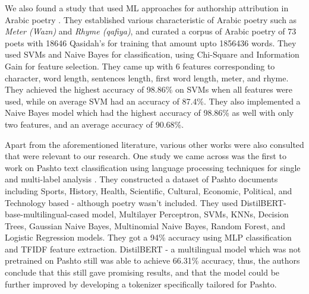 We also found a study that used ML approaches for authorship attribution in Arabic poetry \cite{arabic_poetry_attribution}. They established various characteristic of Arabic poetry such as \textit{Meter (Wazn)} and \textit{Rhyme (qafiya)}, and curated a corpus of Arabic poetry of 73 poets with 18646 Qasidah's for training that amount upto 1856436 words. They used SVMs and Naive Bayes for classification, using Chi-Square and Information Gain for feature selection. They came up with 6 features corresponding to character, word length, sentences length, first word length, meter, and rhyme. They achieved the highest accuracy of 98.86\% on SVMs when all features were used, while on average SVM had an accuracy of 87.4\%. They also implemented a Naive Bayes model which had the highest accuracy of 98.86\% as well with only two features, and an average accuracy of 90.68\%. 

Apart from the aforementioned literature, various other works were also consulted that were relevant to our research. One study we came across was the first to work on Pashto text classification using language processing techniques for single and multi-label analysis \cite{pashto_text_classification}. They constructed a dataset of Pashto documents including Sports, History, Health, Scientific, Cultural, Economic, Political, and Technology based - although poetry wasn't included. They used DistilBERT-base-multilingual-cased model, Multilayer Perceptron, SVMs, KNNs, Decision Trees, Gaussian Naive Bayes, Multinomial Naive Bayes, Random Forest, and Logistic Regression models. They got a 94\% accuracy using MLP classification and TFIDF feature extraction. DistilBERT - a multilingual model which was not pretrained on Pashto still was able to achieve 66.31\% accuracy, thus, the authors conclude that this still gave promising results, and that the model could be further improved by developing a tokenizer specifically tailored for Pashto.   